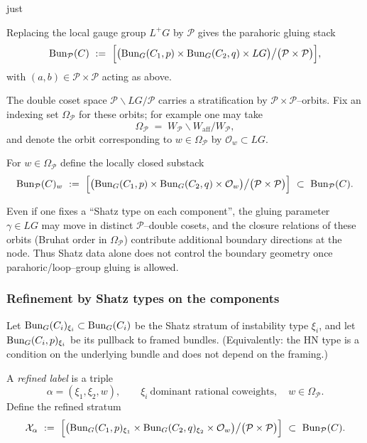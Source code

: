 just \documentclass[12pt]{article}
\begin{document}
Replacing the local gauge group $L^+G$ by $\mathcal P$ gives the parahoric gluing stack
\begin{equation}
\label{eq:X-parahoric-gluing}
\operatorname{Bun}_{\mathcal P}(C)
\ :=\
\Bigl[\bigl(\operatorname{Bun}_G(C_1,p)\times \operatorname{Bun}_G(C_2,q)\times LG\bigr)\big/\bigl(\mathcal P\times \mathcal P\bigr)\Bigr],
\end{equation}
with $(a,b)\in\mathcal P\times\mathcal P$ acting as above.

The double coset space $\mathcal P\backslash LG/\mathcal P$ carries a stratification by
$\mathcal P\times\mathcal P$--orbits.  Fix an indexing set $\Omega_{\mathcal P}$ for these
orbits; for example one may take
\[
\Omega_{\mathcal P}\;=\;W_{\mathcal P}\backslash W_{\mathrm{aff}}/W_{\mathcal P},
\]
and denote the orbit corresponding to $w\in\Omega_{\mathcal P}$ by $\mathcal O_w\subset LG$.

\begin{definition}
\label{def:orbit-strata}
For $w\in\Omega_{\mathcal P}$ define the locally closed substack
\[
\operatorname{Bun}_{\mathcal P}(C)_w
\ :=\
\Bigl[\bigl(\operatorname{Bun}_G(C_1,p)\times \operatorname{Bun}_G(C_2,q)\times \mathcal O_w\bigr)\big/\bigl(\mathcal P\times \mathcal P\bigr)\Bigr]
\ \subset\ \operatorname{Bun}_{\mathcal P}(C).
\]
\end{definition}

\begin{remark}
Even if one fixes a ``Shatz type on each component'', the gluing parameter $\gamma\in LG$
may move in distinct $\mathcal P$--double cosets, and the closure relations of these orbits
(Bruhat order in $\Omega_{\mathcal P}$) contribute additional boundary directions at the node.
Thus Shatz data alone does not control the boundary geometry once parahoric/loop--group
gluing is allowed.
\end{remark}

\subsubsection*{Refinement by Shatz types on the components}
Let $\operatorname{Bun}_G(C_i)_{\xi_i}\subset \operatorname{Bun}_G(C_i)$ be the Shatz stratum of instability type $\xi_i$,
and let $\operatorname{Bun}_G(C_i,p)_{\xi_i}$ be its pullback to framed bundles.
(Equivalently: the HN type is a condition on the underlying bundle and does not depend on the framing.)

\begin{definition}
\label{def:refined-strata}
A \emph{refined label} is a triple
\[
\alpha=(\xi_1,\xi_2,w),
\qquad \xi_i\ \text{dominant rational coweights},\quad w\in\Omega_{\mathcal P}.
\]
Define the refined stratum
\begin{equation}
\label{eq:X-alpha}
\mathcal X_\alpha
\ :=\
\Bigl[\bigl(\operatorname{Bun}_G(C_1,p)_{\xi_1}\times \operatorname{Bun}_G(C_2,q)_{\xi_2}\times \mathcal O_w\bigr)\big/\bigl(\mathcal P\times \mathcal P\bigr)\Bigr]
\ \subset\ \operatorname{Bun}_{\mathcal P}(C).
\end{equation}
\end{definition}
\end{document}
